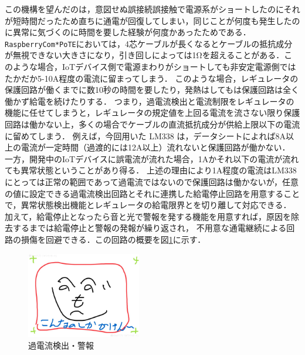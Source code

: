 この機構を望んだのは，意図せぬ誤接続誤接触で電源系がショートしたのにそれが短時間だったため直ちに通電が回復してしまい，同じことが何度も発生したのに異常に気づくのに時間を要した経験が何度かあったためである．
{\tt Raspberry\-Com*PoTE}においては，4芯ケーブルが長くなるとケーブルの抵抗成分が無視できない大きさになり，引き回しによっては1Ωを超えることがある．このような場合，IoTデバイス側で電源まわりがショートしても非安定電源側ではたかだか5-10A程度の電流に留まってしまう．
このような場合，レギュレータの保護回路が働くまでに数10秒の時間を要したり，発熱はしてもは保護回路は全く働かず給電を続けたりする．
つまり，過電流検出と電流制限をレギュレータの機能に任せてしまうと，レギュレータの規定値を上回る電流を流さない限り保護回路は働かない上，多くの場合でケーブルの直流抵抗成分が供給上限以下の電流に留めてしまう．
例えば，今回用いた LM338 は，データシートによれば8A以上の電流が一定時間（過渡的には12A以上）流れないと保護回路が働かない．
一方，開発中のIoTデバイスに誤電流が流れた場合，1Aかそれ以下の電流が流れても異常状態ということがあり得る．
上述の理由により1A程度の電流はLM338にとっては正常の範囲であって過電流ではないので保護回路は働かないが，任意の値に設定できる過電流検出回路とそれに連携した給電停止回路を用意することで，異常状態検出機能とレギュレータの給電限界とを切り離して対応できる．
加えて，給電停止となったら音と光で警報を発する機能を用意すれば，原因を除去するまでは給電停止と警報の発報が繰り返され，
不用意な通電継続による回路の損傷を回避できる．この回路の概要を図\ref{hohno:RaspberryComPoTE-Po2}に示す．

\vspace{-1zh}
\begin{figure}[H]
\centering
\includegraphics[width=5cm]{figspics/henoheno.jpeg}
\caption{過電流検出・警報}
\label{hohno:RaspberryComPoTE-Po2}
\end{figure}
\vspace{-1zh}



